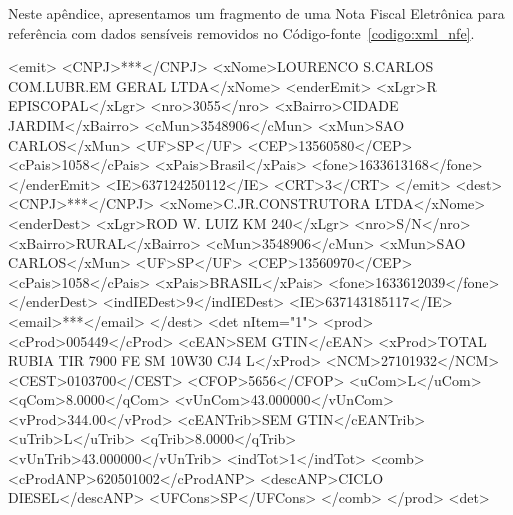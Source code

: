 
Neste apêndice, apresentamos um fragmento de uma Nota Fiscal Eletrônica para referência com dados sensíveis removidos no Código-fonte~\ref{codigo:xml_nfe}.

\begin{codigo}[caption = {Exemplo de fragmento de NFe com dados sensíveis removidos}, label={codigo:xml_nfe},language=XML, breaklines=true]
<emit>
	<CNPJ>***</CNPJ>
	<xNome>LOURENCO S.CARLOS COM.LUBR.EM GERAL LTDA</xNome>
	<enderEmit>
		<xLgr>R EPISCOPAL</xLgr>
		<nro>3055</nro>
		<xBairro>CIDADE JARDIM</xBairro>
		<cMun>3548906</cMun>
		<xMun>SAO CARLOS</xMun>
		<UF>SP</UF>
		<CEP>13560580</CEP>
		<cPais>1058</cPais>
		<xPais>Brasil</xPais>
		<fone>1633613168</fone>
	</enderEmit>
	<IE>637124250112</IE>
	<CRT>3</CRT>
</emit>
<dest>
	<CNPJ>***</CNPJ>
	<xNome>C.JR.CONSTRUTORA LTDA</xNome>
	<enderDest>
		<xLgr>ROD W. LUIZ KM 240</xLgr>
		<nro>S/N</nro>
		<xBairro>RURAL</xBairro>
		<cMun>3548906</cMun>
		<xMun>SAO CARLOS</xMun>
		<UF>SP</UF>
		<CEP>13560970</CEP>
		<cPais>1058</cPais>
		<xPais>BRASIL</xPais>
		<fone>1633612039</fone>
	</enderDest>
	<indIEDest>9</indIEDest>
	<IE>637143185117</IE>
	<email>***</email>
</dest>
<det nItem="1">
	<prod>
		<cProd>005449</cProd>
		<cEAN>SEM GTIN</cEAN>
		<xProd>TOTAL RUBIA TIR 7900 FE SM 10W30 CJ4 L</xProd>
		<NCM>27101932</NCM>
		<CEST>0103700</CEST>
		<CFOP>5656</CFOP>
		<uCom>L</uCom>
		<qCom>8.0000</qCom>
		<vUnCom>43.000000</vUnCom>
		<vProd>344.00</vProd>
		<cEANTrib>SEM GTIN</cEANTrib>
		<uTrib>L</uTrib>
		<qTrib>8.0000</qTrib>
		<vUnTrib>43.000000</vUnTrib>
		<indTot>1</indTot>
		<comb>
			<cProdANP>620501002</cProdANP>
			<descANP>CICLO DIESEL</descANP>
			<UFCons>SP</UFCons>
		</comb>
	</prod>
<det>
\end{codigo}